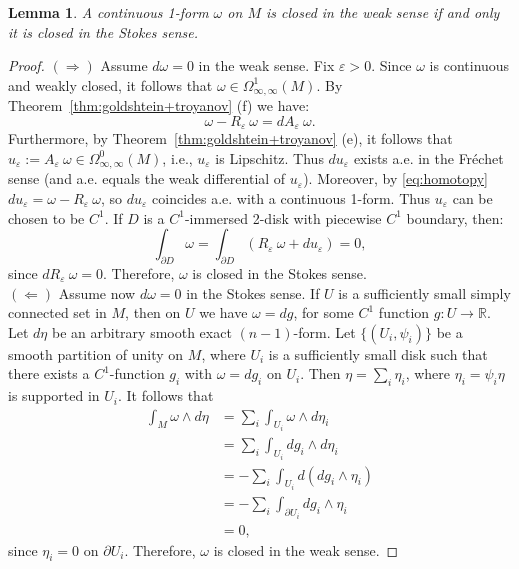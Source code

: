 \documentclass[11pt,letterpaper,reqno,abstract=true]{scrartcl}
\theoremstyle{plain}                              %
\newtheorem{lem}[thm]{Lemma}
\theoremstyle{definition}                         %
\theoremstyle{remark}                             %
\newcommand{\R}{\mathbb{R}}                     %
\newcommand{\veps}{\varepsilon}
\newcommand{\del}{\partial}
\begin{document}
\begin{lem}    \label{lem:regularization}
  A continuous 1-form $\omega$ on $M$ is closed in the weak sense if
  and only it is closed in the Stokes sense.
  
\end{lem}

\begin{proof}
  $(\Rightarrow)$ Assume $d\omega = 0$ in the weak sense. Fix
  $\veps > 0$. Since $\omega$ is continuous and weakly closed, it
  follows that $\omega \in \Omega^1_{\infty,\infty}(M)$. By
  Theorem~\ref{thm:goldshtein+troyanov} (f) we have:
  \begin{equation}   \label{eq:homotopy}
    \omega - R_\veps \: \omega = d A_\veps \: \omega.
  \end{equation}
  Furthermore, by Theorem~\ref{thm:goldshtein+troyanov} (e), it
  follows that
  $u_\veps := A_\veps \: \omega \in \Omega^0_{\infty,\infty}(M)$,
  i.e., $u_\veps$ is Lipschitz. Thus $du_\veps$ exists a.e. in the
  Fr\'echet sense (and a.e. equals the weak differential of
  $u_\veps$). Moreover, by \eqref{eq:homotopy}
  $du_\veps = \omega - R_\veps \: \omega$, so $du_\veps$ coincides
  a.e. with a continuous 1-form. Thus $u_\veps$ can be chosen to be
  $C^1$. If $D$ is a $C^1$-immersed 2-disk with piecewise $C^1$
  boundary, then:
  \begin{displaymath}
    \int_{\del D} \omega = \int_{\del D} ( R_\veps \: \omega +
    du_\veps ) = 0,
  \end{displaymath}
  since $d R_\veps \: \omega = 0$. Therefore, $\omega$ is closed in
  the Stokes sense. \\

  \noindent $(\Leftarrow)$ Assume now $d\omega = 0$ in the Stokes
  sense. If $U$ is a sufficiently small simply connected set in $M$,
  then on $U$ we have $\omega = dg$, for some $C^1$ function
  $g : U \to \R$. Let $d\eta$ be an arbitrary smooth exact
  $(n-1)$-form. Let $\{ (U_i, \psi_i) \}$ be a smooth partition of
  unity on $M$, where $U_i$ is a sufficiently small disk such that
  there exists a $C^1$-function $g_i$ with $\omega = dg_i$ on
  $U_i$. Then $\eta = \sum_i \eta_i$, where $\eta_i = \psi_i \eta$ is
  supported in $U_i$. It follows that
  \begin{align*}
    \int_M \omega \wedge d\eta & = \sum_i \int_{U_i} \omega \wedge
                                 d\eta_i \\
                               & = \sum_i \int_{U_i} dg_i \wedge d\eta_i \\
                               & = -\sum_i \int_{U_i} d (dg_i \wedge \eta_i) \\
                               & = - \sum_i \int_{\del U_i} dg_i \wedge \eta_i \\
    & = 0,
  \end{align*}
  since $\eta_i = 0$ on $\del U_i$. Therefore, $\omega$ is closed in
  the weak sense.
\end{proof}
\end{document}
